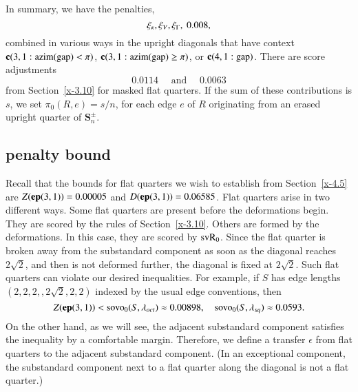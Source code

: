 In summary, we have the penalties,
    $$\xi_\kappa,\xi_V,\xi_\Gamma,\ 0.008,$$
combined in various ways in the upright diagonals that have context
${\operatorname{\bf c}}{(3,1: {\operatorname{azim}}({\operatorname{gap}}) <\pi)}$, ${\operatorname{\bf c}}{(3,1: {\operatorname{azim}}({\operatorname{gap}}) \ge \pi)}$, or ${\operatorname{\bf c}}{(4,1:{\operatorname{gap}})}$.  There are score
adjustments
    $$0.0114\quad \text{ and }\quad 0.0063$$
from Section~\ref{x-3.10} for masked flat quarters.  If the sum of these
contributions is $s$, we set $\pi_0(R,e)=s/n$, for each edge $e$ of $R$
originating from an erased upright quarter of
    $\mathcal{\mathbf S}_n^\pm$.

\subsection{penalty bound} %

Recall that the bounds for flat quarters we wish to establish from
Section~\ref{x-4.5} are $Z({\operatorname{\bf ep}}{(3,1)})=0.00005$ and $D({\operatorname{\bf ep}}{(3,1)})=0.06585$. Flat
quarters arise in two different ways.  Some flat quarters are present
before the deformations begin.  They are scored by the rules of
Section~\ref{x-3.10}. Others are formed by the deformations.  In this
case, they are scored by ${\operatorname{svR}}_0$. Since the flat quarter is broken away
from the substandard component as soon as the diagonal reaches $2\sqrt{2}$, and then
is not deformed further, the diagonal is fixed at $2\sqrt{2}$.  Such
flat quarters can violate our desired inequalities. For example,
if $S$ has edge lengths $(2,2,2,,2\sqrt{2},2,2)$ indexed by the usual
edge conventions, then
    $$
    Z({\operatorname{\bf ep}}{(3,1)})<{\operatorname{sovo}}_0(S,\lambda_{oct}) 
      \approx 0.00898,\quad
        {\operatorname{sovo}}_0(S,\lambda_{sq})\approx 0.0593.
    $$
On the other hand, as we will see, the adjacent substandard component satisfies the
inequality by a comfortable margin.  Therefore, we define a transfer
$\epsilon$ from flat quarters to the adjacent substandard component. (In an
exceptional component, the substandard component next to a flat quarter along the
diagonal is not a flat quarter.)

